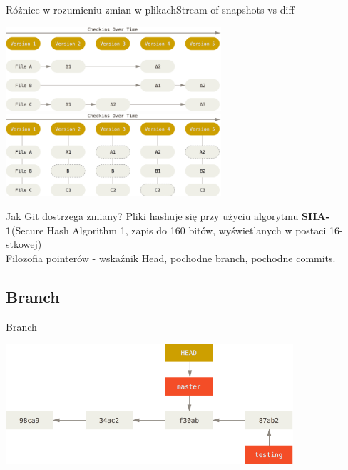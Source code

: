 \documentclass{beamer}
\begin{document}
\begin{frame}{Różnice w rozumieniu zmian w plikach}{Stream of snapshots vs diff}
  \begin{center}
   \includegraphics[width=0.6\textwidth]{./obrazki/fig-1_4.png}\\
   \includegraphics[width=0.6\textwidth]{./obrazki/fig-1_5.png}
 \end{center}

\end{frame}

\begin{frame}{Jak Git dostrzega zmiany?}
 Pliki hashuje się przy użyciu algorytmu \textbf{SHA-1}(Secure Hash Algorithm 1, zapis do 160 bitów, wyświetlanych w postaci 16-stkowej) \\
 
 Filozofia pointerów - wskaźnik Head, pochodne branch, pochodne commits.
\end{frame}

\subsection{Branch}
\begin{frame}{Branch}
   \begin{center}
   \includegraphics[width=0.8\textwidth]{./obrazki/fig-3_8.png}
 \end{center}
\end{frame}
\end{document}
